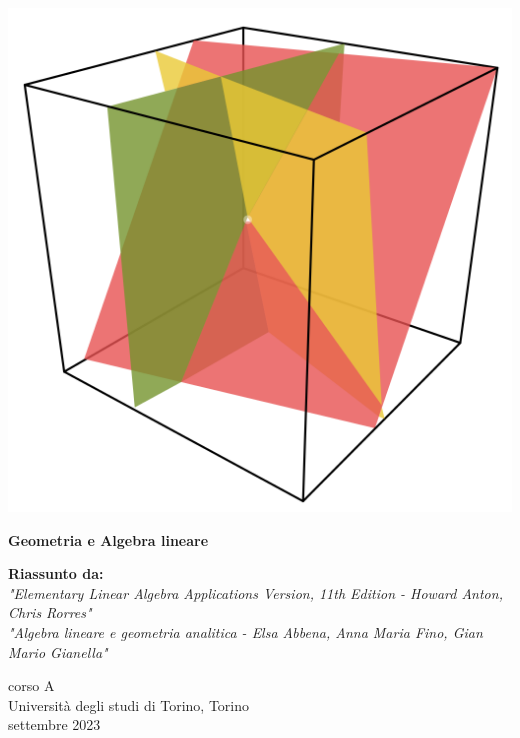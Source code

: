 \begin{titlepage}
   \begin{center}
       \vspace*{1cm}
       \begin{center}
           \includegraphics[scale =0.17]{pngegg.png}
       \end{center}
        \vspace{1.5cm}
       \textbf{\LARGE Geometria e Algebra lineare}

       \vspace{0.5cm}
        \textbf{Riassunto da:} \\
        
        \textit{"Elementary Linear Algebra Applications Version, 11th Edition - Howard Anton, Chris Rorres"} \\
        
        \textit{"Algebra lineare e geometria analitica - Elsa Abbena, Anna Maria Fino, Gian Mario Gianella"}


       \vfill
            
       
            
       \vspace{0.8cm}
     
       
            
       corso A\\
       Università degli studi di Torino, Torino\\
       settembre 2023\\
       
            
   \end{center}
\end{titlepage}
